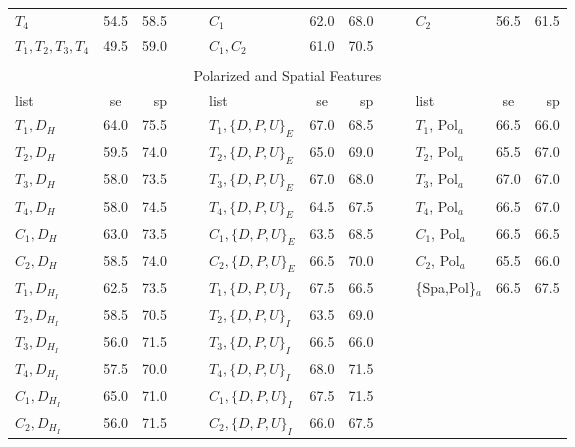 \begin{table}
\begin{center}
{{\begin{tabular}{lcr	cc lcr cc lcr }
 $T_{4}$	 & 54.5 & 58.5 & & &  \cellcolor[gray]{0.8}$C_{1}$ & \cellcolor[gray]{0.8} 62.0 & \cellcolor[gray]{0.8} 68.0 & & & $C_{2}$ & 56.5 & 61.5  \\
 $T_{1},T_{2},T_{3},T_{4}$ & 49.5 & 59.0 & &  & $C_{1},C_{2}$ & 61.0 & 70.5&  \\\\[-2ex]
\midrule
\multicolumn{13}{c}{Polarized and Spatial Features}\\
\midrule
list & \acs{se} & \acs{sp} & & & list & \acs{se} & \acs{sp} & & & list & \acs{se} & \acs{sp}\\
\midrule
\cellcolor[gray]{0.8}$T_{1}, D_{H}$ & \cellcolor[gray]{0.8}64.0 & \cellcolor[gray]{0.8}75.5 & & & \cellcolor[gray]{0.8}$T_{1}, \{D,P,U\}_{E}$ & \cellcolor[gray]{0.8}67.0 & \cellcolor[gray]{0.8}68.5 & & & $T_{1}$, Pol$_{a}$ & 66.5 & 66.0 \\
$T_{2}, D_{H}$ & 59.5 & 74.0 & & & $T_{2}, \{D,P,U\}_{E}$ & 65.0 & 69.0 & & & $T_{2}$, Pol$_{a}$ & 65.5 & 67.0\\
$T_{3}, D_{H}$ & 58.0 & 73.5 & & & \cellcolor[gray]{0.8}$T_{3}, \{D,P,U\}_{E}$ & \cellcolor[gray]{0.8}67.0 & \cellcolor[gray]{0.8}68.0 & & & \cellcolor[gray]{0.8}$T_{3}$, Pol$_{a}$ & 6\cellcolor[gray]{0.8}7.0 & \cellcolor[gray]{0.8}67.0\\
$T_{4}, D_{H}$ & 58.0 & 74.5 & & & $T_{4}, \{D,P,U\}_{E}$ & 64.5 & 67.5 & & & $T_{4}$, Pol$_{a}$ & 66.5 & 67.0\\
$C_{1}, D_{H}$ & 63.0 & 73.5 & & & $C_{1}, \{D,P,U\}_{E}$ & 63.5 & 68.5 & & & $C_{1}$, Pol$_{a}$ & 66.5 & 66.5\\
$C_{2}, D_{H}$ & 58.5 & 74.0 & & & $C_{2}, \{D,P,U\}_{E}$ & 66.5 & 70.0 & & & $C_{2}$, Pol$_{a}$ & 65.5 & 66.0\\
$T_{1}, D_{H_{I}}$ & 62.5 & 73.5 & & & \cellcolor[gray]{0.8}$T_{1}, \{D,P,U\}_{I}$ & \cellcolor[gray]{0.8}67.5 & \cellcolor[gray]{0.8}66.5  & & & \{Spa,Pol\}$_{a}$ & 66.5 & 67.5\\
$T_{2}, D_{H_{I}}$ & 58.5 & 70.5 & & & $T_{2}, \{D,P,U\}_{I}$ & 63.5 & 69.0  \\
$T_{3}, D_{H_{I}}$ & 56.0 & 71.5 & & & $T_{3}, \{D,P,U\}_{I}$ & 66.5 & 66.0  \\
$T_{4}, D_{H_{I}}$ & 57.5 & 70.0 & & & \cellcolor[gray]{0.8}$T_{4}, \{D,P,U\}_{I}$ & \cellcolor[gray]{0.8}68.0 & \cellcolor[gray]{0.8}71.5  \\
$C_{1}, D_{H_{I}}$ & 65.0 & 71.0 & & & \cellcolor[gray]{0.8}$C_{1}, \{D,P,U\}_{I}$ & \cellcolor[gray]{0.8}67.5 & \cellcolor[gray]{0.8}71.5  \\
$C_{2}, D_{H_{I}}$ & 56.0 & 71.5 & & & $C_{2}, \{D,P,U\}_{I}$ & 66.0 & 67.5  \\

\bottomrule

\end{tabular}}}
\end{center}
\label{tab:table4}
\end{table}

